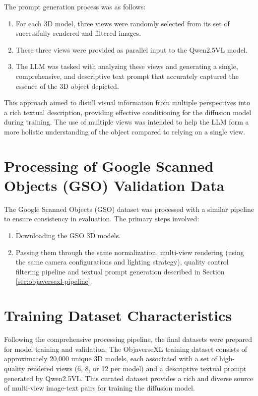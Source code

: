 The prompt generation process was as follows:
\begin{enumerate}
  \item For each 3D model, three views were randomly selected from its set of successfully rendered and filtered images.
  \item These three views were provided as parallel input to the Qwen2.5VL model.
  \item The LLM was tasked with analyzing these views and generating a single, comprehensive, and descriptive text prompt that accurately captured the essence of the 3D object depicted.
\end{enumerate}
This approach aimed to distill visual information from multiple perspectives into a rich textual description, providing effective conditioning for the diffusion model during training. The use of multiple views was intended to help the LLM form a more holistic understanding of the object compared to relying on a single view.

\section{Processing of Google Scanned Objects (GSO) Validation Data}\label{sec:gso-processing}
The Google Scanned Objects (GSO) dataset was processed with a similar pipeline to ensure consistency in evaluation. The primary steps involved:
\begin{enumerate}
  \item Downloading the GSO 3D models.
  \item Passing them through the same normalization, multi-view rendering (using the same camera configurations and lighting strategy), quality control filtering pipeline and textual prompt generation described in Section \ref{sec:objaversexl-pipeline}.
\end{enumerate}

\section{Training Dataset Characteristics}\label{sec:final-dataset-chars}
Following the comprehensive processing pipeline, the final datasets were prepared for model training and validation.
The ObjaverseXL training dataset consists of approximately 20,000 unique 3D models, each associated with a set of high-quality rendered views (6, 8, or 12 per model) and a descriptive textual prompt generated by Qwen2.5VL. This curated dataset provides a rich and diverse source of multi-view image-text pairs for training the diffusion model.

